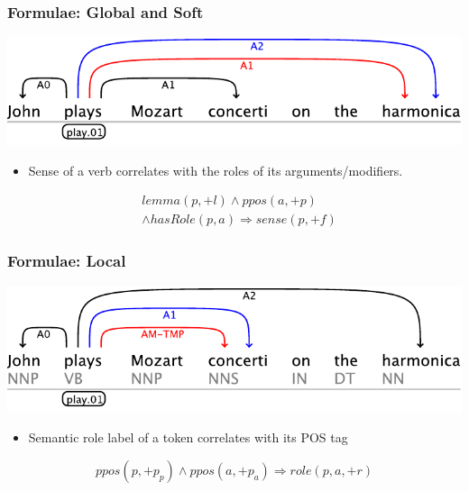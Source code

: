 \documentclass{beamer} \setbeamertemplate{navigation symbols}{}
\begin{document}
\begin{frame}
  \frametitle{Formulae: Global and Soft}
  \begin{center}
    \includegraphics[scale=.70]{example-2}
  \end{center}

  \begin{itemize}
  \item Sense of a verb correlates with the roles of its
    arguments/modifiers.
  \end{itemize}

  \begin{eqnarray*}
    & lemma(p,+l) \wedge ppos(a,+p)  \\
    & \wedge hasRole(p,a)  \Rightarrow sense(p,+f) 
  \end{eqnarray*}

\end{frame}


\begin{frame}
  \frametitle{Formulae: Local}
    
  \begin{center}
    \includegraphics[scale=.70]{example-3}
  \end{center}

  \begin{itemize}
  \item Semantic role label of a token correlates with its POS tag
  \end{itemize}

  \[ppos(p,+p_p) \wedge ppos(a,+p_a) \Rightarrow role(p,a,+r)\]

\end{frame}
\end{document}
